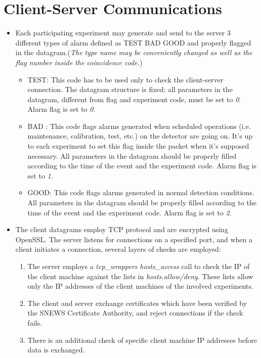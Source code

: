 \documentclass{article}
\begin{document}
\section{Client-Server Communications}
\begin{itemize}
\item Each participating experiment may generate and send to the server
3 different types of alarm defined as TEST BAD GOOD and 
properly flagged in the datagram.({\it The type name may be conveniently 
changed as well as the flag number inside the coincidence code.})
\begin{itemize}
\item TEST: This code has to be used only to check the client-server
connection. The datagram structure is fixed: all parameters in the
datagram, different from flag and
experiment code, must be set to {\it 0}. Alarm flag is set to {\it 0}. 

\item BAD : This code flags alarms generated when scheduled operations
(i.e. maintenance, calibration, test, etc.) on the detector are going on. It's
up to each experiment to set this flag inside the packet when it's supposed
necessary. 
All parameters in the datagram should be properly filled according
to the time of the event and the experiment code. Alarm flag is set to 
{\it 1}.

\item GOOD: This code flags alarms generated in normal detection conditions.
All parameters in the datagram should be properly filled according
to the time of the event and the experiment code. Alarm flag is set to 
{\it 2}.
\end{itemize}
 

\item The client datagrams employ TCP protocol and 
are encrypted using OpenSSL.  
The server listens for connections on a specified port,
and when a client initiates a connection, several layers
of checks are employed:
\begin{enumerate}
\item The server employs a {\it tcp\_wrappers hosts\_access}
call to check the IP of the client machine against the lists in
{\it hosts.allow/deny}.  These lists allow only the IP addresses
of the client machines of the involved experiments.
\item
The client and server exchange certificates which have been
verified by the SNEWS Certificate Authority, and reject
connections if the check fails.
\item There is an additional check of specific client machine
IP addresses before data is exchanged.
\end{enumerate}
\end{itemize}
\end{document}
